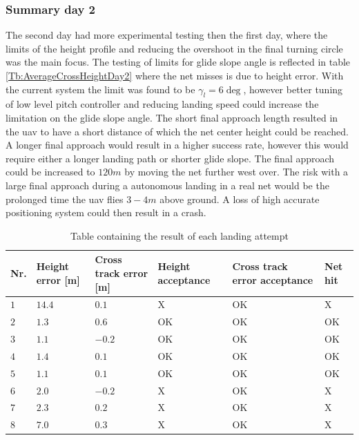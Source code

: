\subsubsection{Summary day 2}
The second day had more experimental testing then the first day, where the limits of the height profile and reducing the overshoot in the final turning circle was the main focus. The testing of limits for glide slope angle is reflected in table \ref{Tb:AverageCrossHeightDay2} where the net misses is due to height error. With the current system the limit was found to be $\gamma_l=6\deg$, however better tuning of low level pitch controller and reducing landing speed could increase the limitation on the glide slope angle. The short final approach length resulted in the \gls{uav} to have a short distance of which the net center height could be reached. A longer final approach would result in a higher success rate, however this would require either a longer landing path or shorter glide slope. The final approach could be increased to $120 m$ by moving the net further west over. The risk with a large final approach during a autonomous landing in a real net would be the prolonged time the \gls{uav} flies $3-4 m$ above ground. A loss of high accurate positioning system could then result in a crash.
\begin{table}[H]
\centering
\begin{tabular}{| p{0.5cm} | p{1cm} | p{1cm} | p{3.5cm} | p{3cm} | p{1cm} |}
\hline
\textbf{Nr.}	& \textbf{Height error [m]}	& \textbf{Cross track error [m]}& \textbf{Height acceptance}& \textbf{Cross track error acceptance}	& \textbf{Net hit}\\ \hline
$1$				& $14.4$		& $0.1$		& X								& OK									& X					\\ \hline
$2$				& $1.3$		& $0.6$	& OK								& OK										& OK					\\ \hline
$3$				& $1.1$		& $-0.2$	& OK							& OK									& OK				\\ \hline
$4$				& $1.4$		& $0.1$		& OK							& OK										& OK					\\ \hline
$5$				& $1.1$		& $0.1$		& OK							& OK										& OK					\\ \hline
$6$				& $2.0$		& $-0.2$	& X								& OK									& X					\\ \hline
$7$				& $2.3$		& $0.2$		& X							& OK									& X				\\ \hline
$8$				& $7.0$	& $0.3$	& X								& OK										& X					\\ \hline
\end{tabular}
\caption{Table containing the result of each landing attempt}
\label{tb:Day2LandingAttempt}
\end{table}

